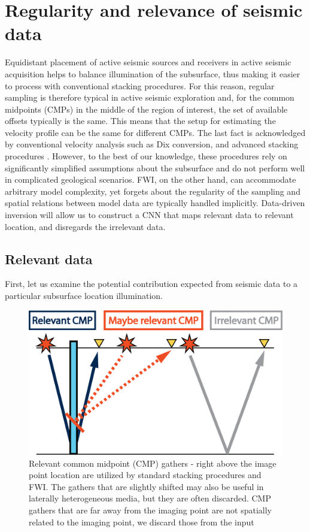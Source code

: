 \documentclass[paper,twocolomn]{geophysics}
\begin{document}
\section{Regularity and relevance of seismic data}
Equidistant placement of active seismic sources and receivers in active seismic acquisition helps to balance illumination of the subsurface, thus making it easier to process with conventional stacking procedures. For this reason, regular sampling is therefore typical in active seismic exploration and, for the common midpoints (CMPs) in the middle of the region of interest, the set of available offsets typically is the same.
This means that the setup for estimating the velocity profile can be the same for different CMPs.
The last fact is acknowledged by conventional velocity analysis such as Dix conversion, and advanced stacking procedures \citep{mann1999common}. However, to the best of our knowledge, these procedures rely on significantly simplified assumptions about the subsurface and do not perform well in complicated geological scenarios.
FWI, on the other hand, can accommodate arbitrary model complexity, yet forgets about the regularity of the sampling and spatial relations between model data are typically handled implicitly. Data-driven inversion will allow us to construct a CNN that maps relevant data to relevant location, and disregards the irrelevant data.  

\subsection{Relevant data}

First, let us examine the potential contribution expected from seismic data to a particular subsurface location illumination.

\begin{figure}[h!]
	\centering
	\includegraphics[width=0.7\linewidth]{Fig/relevantCMP}
	\caption{Relevant common midpoint (CMP) gathers - right above the image point location are utilized by standard stacking procedures and FWI. The gathers that are slightly shifted may also be useful in laterally heterogeneous media, but they are often discarded. CMP gathers that are far away from the imaging point are not spatially related to the imaging point, we discard those from the input}
	\label{fig:relevantCMP}
\end{figure}
\end{document}
